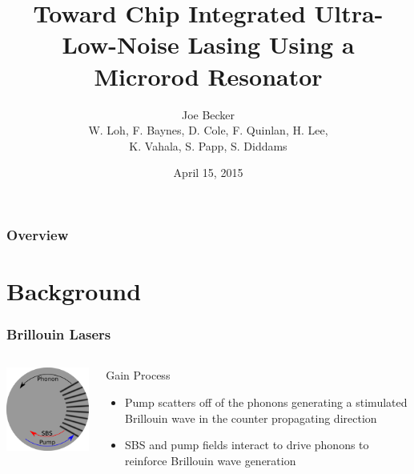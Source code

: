 \documentclass{beamer}
\title[Microrod Lasing]{Toward Chip Integrated Ultra-Low-Noise Lasing Using a Microrod Resonator} %
\author[J. Becker]{Joe Becker \\
\scriptsize{W. Loh, F. Baynes, D. Cole, F. Quinlan, H. Lee,\\
K. Vahala, S. Papp, S. Diddams}} %
\institute[NIST] %
{
National Institute of Standards and Technology\\ %
\medskip
\textit{Joe.Becker@nist.gov} %
}
\date{April 15, 2015} %
\begin{document}
\begin{frame}
\titlepage %
\end{frame}

\begin{frame}
\frametitle{Overview} %
\tableofcontents %
\end{frame}



\section{Background} 
\begin{frame}\frametitle{Brillouin Lasers}
\begin{columns}
\includegraphics[width=5cm,keepaspectratio]{Images/SBS_Figure.png}

\begin{block}{Gain Process}
\begin{itemize}
\item Pump scatters off of the phonons generating a stimulated Brillouin wave in the counter propagating direction 
\item SBS and pump fields interact to drive phonons to reinforce Brillouin wave generation
\end{itemize}
\end{block}

\end{columns}
\end{frame}
\end{document}
